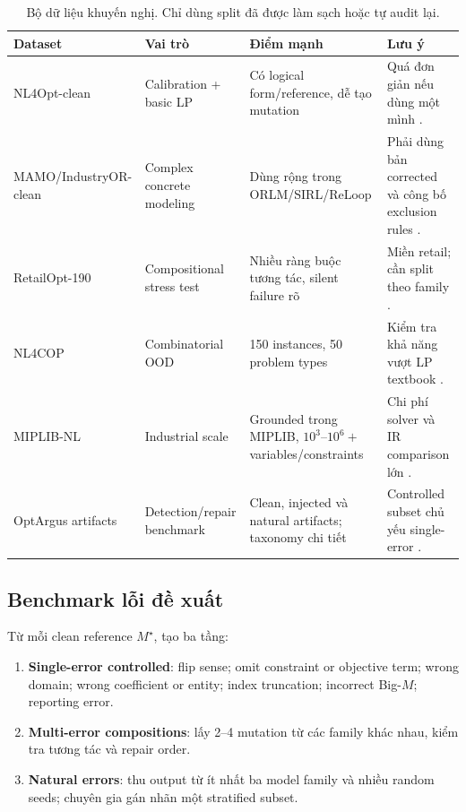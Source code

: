 \documentclass[11pt,a4paper]{article}
\begin{document}
\begin{table}[htbp]
\centering
\caption{Bộ dữ liệu khuyến nghị. Chỉ dùng split đã được làm sạch hoặc tự audit lại.}
\label{tab:datasets}
\footnotesize
\setlength{\tabcolsep}{3pt}
\begin{tabularx}{\textwidth}{L{3.0cm} L{2.2cm} Y Y}
\toprule
\textbf{Dataset} & \textbf{Vai trò} & \textbf{Điểm mạnh} & \textbf{Lưu ý} \\
\midrule
NL4Opt-clean & Calibration + basic LP & Có logical form/reference, dễ tạo mutation & Quá đơn giản nếu dùng một mình \parencite{ramamonjison2023nl4opt,xiao2025survey}. \\
MAMO/IndustryOR-clean & Complex concrete modeling & Dùng rộng trong ORLM/SIRL/ReLoop & Phải dùng bản corrected và công bố exclusion rules \parencite{huang2025orlm,xiao2025survey}. \\
RetailOpt-190 & Compositional stress test & Nhiều ràng buộc tương tác, silent failure rõ & Miền retail; cần split theo family \parencite{lian2026reloop}. \\
NL4COP & Combinatorial OOD & 150 instances, 50 problem types & Kiểm tra khả năng vượt LP textbook \parencite{fang2026trival}. \\
MIPLIB-NL & Industrial scale & Grounded trong MIPLIB, \(10^3\)--\(10^6+\) variables/constraints & Chi phí solver và IR comparison lớn \parencite{li2026miplibnl}. \\
OptArgus artifacts & Detection/repair benchmark & Clean, injected và natural artifacts; taxonomy chi tiết & Controlled subset chủ yếu single-error \parencite{li2026optargus}. \\
\bottomrule
\end{tabularx}
\end{table}

\subsection{Benchmark lỗi đề xuất}

Từ mỗi clean reference \(M^\star\), tạo ba tầng:

\begin{enumerate}
  \item \textbf{Single-error controlled}: flip sense; omit constraint or objective term; wrong domain; wrong coefficient or entity; index truncation; incorrect Big-\(M\); reporting error.
  \item \textbf{Multi-error compositions}: lấy 2--4 mutation từ các family khác nhau, kiểm tra tương tác và repair order.
  \item \textbf{Natural errors}: thu output từ ít nhất ba model family và nhiều random seeds; chuyên gia gán nhãn một stratified subset.
\end{enumerate}
\end{document}
